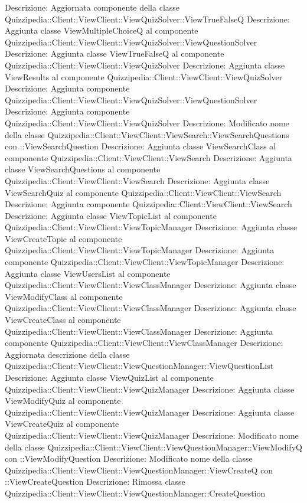 Descrizione: Aggiornata componente della classe Quizzipedia::Client::ViewClient::ViewQuizSolver::ViewTrueFalseQ 
Descrizione: Aggiunta classe ViewMultipleChoiceQ al componente Quizzipedia::Client::ViewClient::ViewQuizSolver::ViewQuestionSolver 
Descrizione: Aggiunta classe ViewTrueFalseQ al componente Quizzipedia::Client::ViewClient::ViewQuizSolver 
Descrizione: Aggiunta classe ViewResults al componente Quizzipedia::Client::ViewClient::ViewQuizSolver 
Descrizione: Aggiunta componente Quizzipedia::Client::ViewClient::ViewQuizSolver::ViewQuestionSolver 
Descrizione: Aggiunta componente Quizzipedia::Client::ViewClient::ViewQuizSolver 
Descrizione: Modificato nome della classe Quizzipedia::Client::ViewClient::ViewSearch::ViewSearchQuestions con ::ViewSearchQuestion 
Descrizione: Aggiunta classe ViewSearchClass al componente Quizzipedia::Client::ViewClient::ViewSearch 
Descrizione: Aggiunta classe ViewSearchQuestions al componente Quizzipedia::Client::ViewClient::ViewSearch 
Descrizione: Aggiunta classe ViewSearchQuiz al componente Quizzipedia::Client::ViewClient::ViewSearch 
Descrizione: Aggiunta componente Quizzipedia::Client::ViewClient::ViewSearch 
Descrizione: Aggiunta classe ViewTopicList al componente Quizzipedia::Client::ViewClient::ViewTopicManager 
Descrizione: Aggiunta classe ViewCreateTopic al componente Quizzipedia::Client::ViewClient::ViewTopicManager 
Descrizione: Aggiunta componente Quizzipedia::Client::ViewClient::ViewTopicManager 
Descrizione: Aggiunta classe ViewUsersList al componente Quizzipedia::Client::ViewClient::ViewClassManager 
Descrizione: Aggiunta classe ViewModifyClass al componente Quizzipedia::Client::ViewClient::ViewClassManager 
Descrizione: Aggiunta classe ViewCreateClass al componente Quizzipedia::Client::ViewClient::ViewClassManager 
Descrizione: Aggiunta componente Quizzipedia::Client::ViewClient::ViewClassManager 
Descrizione: Aggiornata descrizione della classe Quizzipedia::Client::ViewClient::ViewQuestionManager::ViewQuestionList 
Descrizione: Aggiunta classe ViewQuizList al componente Quizzipedia::Client::ViewClient::ViewQuizManager 
Descrizione: Aggiunta classe ViewModifyQuiz al componente Quizzipedia::Client::ViewClient::ViewQuizManager 
Descrizione: Aggiunta classe ViewCreateQuiz al componente Quizzipedia::Client::ViewClient::ViewQuizManager 
Descrizione: Modificato nome della classe Quizzipedia::Client::ViewClient::ViewQuestionManager::ViewModifyQ con ::ViewModifyQuestion 
Descrizione: Modificato nome della classe Quizzipedia::Client::ViewClient::ViewQuestionManager::ViewCreateQ con ::ViewCreateQuestion 
Descrizione: Rimossa classe Quizzipedia::Client::ViewClient::ViewQuestionManager::CreateQuestion 
